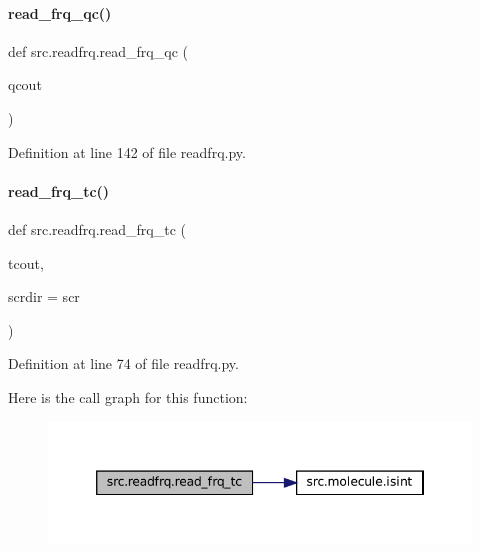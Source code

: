 \paragraph{\texorpdfstring{read\+\_\+frq\+\_\+qc()}{read\_frq\_qc()}}
{\footnotesize\ttfamily def src.\+readfrq.\+read\+\_\+frq\+\_\+qc (\begin{DoxyParamCaption}\item[{}]{qcout }\end{DoxyParamCaption})}



Definition at line 142 of file readfrq.\+py.

\mbox{\label{namespacesrc_1_1readfrq_af9e59f81d04fd3dfbb651e36175fa1b1}} 
\paragraph{\texorpdfstring{read\+\_\+frq\+\_\+tc()}{read\_frq\_tc()}}
{\footnotesize\ttfamily def src.\+readfrq.\+read\+\_\+frq\+\_\+tc (\begin{DoxyParamCaption}\item[{}]{tcout,  }\item[{}]{scrdir = {\ttfamily \textquotesingle{}scr\textquotesingle{}} }\end{DoxyParamCaption})}



Definition at line 74 of file readfrq.\+py.

Here is the call graph for this function\+:
\nopagebreak
\begin{figure}[H]
\begin{center}
\leavevmode
\includegraphics[width=346pt]{namespacesrc_1_1readfrq_af9e59f81d04fd3dfbb651e36175fa1b1_cgraph}
\end{center}
\end{figure}
\mbox{\label{namespacesrc_1_1readfrq_a9e21ebdbb91f1755474babee99d79563}} 
